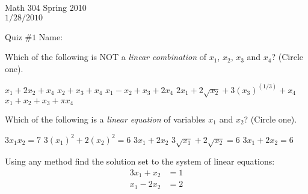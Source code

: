 \documentclass[10pt]{exam}
\begin{document}
Math 304 Spring 2010 \\
$1/28/2010$

Quiz $\#1$ \hspace{1.9in} {Name:} {\underline {\hspace{2.5in}}}
\vspace{.5pc}

\begin{center}
\end{center}

\begin{questions}




\question[2]
Which of the following is NOT a {\it linear combination} of $x_1$, $x_2$, $x_3$ and $x_4$? (Circle one).
\begin{choices}
\choice $x_1 + 2x_2 + x_4$
\choice $x_2 + x_3 + x_4$
\choice $x_1-x_2+x_3+2x_4$
\choice $2x_1 + 2\sqrt{x_2} + 3(x_3)^{(1/3)}+x_4$
\choice $x_1+x_2+x_3+\pi x_4$
\end{choices}
\vspace{1pc}


\question[2]
Which of the following is a {\it linear equation} of variables $x_1$ and $x_2$? (Circle one).
\begin{choices}

\choice $3x_1x_2=7$
\choice $3(x_1)^2 + 2(x_2)^2=6$
\choice $3x_1 + 2x_2$
\choice $3\sqrt{x_1} + 2\sqrt{x_2}=6$
\choice $3x_1 + 2x_2=6$
\end{choices}
\vspace{1pc}

\question[3]
Using any method find the solution set to the system of linear equations:
\begin{align*} 3x_1 + x_2 &= 1 \\ x_1 - 2x_2 &= 2
\end{align*}
\vfill



\end{questions}
\end{document}
